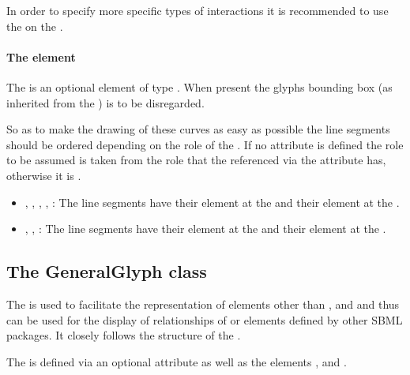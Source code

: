 In order to specify more specific types of interactions it is 
recommended to use the  on the \SpeciesReference. 


\paragraph{The  element}
The  is an optional element of type \Curve. When present 
the glyphs bounding box (as inherited from the \GraphicalObject) is to 
be disregarded. 

So as to make the drawing of these curves as easy as possible the line 
segments should be ordered depending on the role of the 
\SpeciesReferenceGlyph. If no  attribute is defined the role 
to be assumed is taken from the role that the \SpeciesReference 
referenced via the attribute  has, otherwise it 
is . 


\begin{itemize}
	\item {, , , 
	, : The line segments have their 
	 element at the \ReactionGlyph and their  
	element at the \SpeciesGlyph.} 
	\item {, 
	, : The line segments have their 
	 element at the \SpeciesGlyph and their  element 
	at the \ReactionGlyph.} 
\end{itemize}

\subsection{The GeneralGlyph class}
\label{generalglyph-class}
The \GeneralGlyph is used to facilitate the representation of elements 
other than \Compartment, \Species and \Reaction and thus can be used for 
the display of relationships of \Rule or elements defined by other SBML 
packages. It closely follows the structure of the \ReactionGlyph. 

The \GeneralGlyph is defined via an optional attribute  
as well as the elements ,  and 
. 



